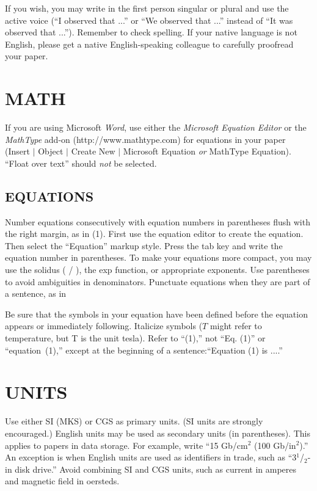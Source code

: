 \documentclass{IEEEojcsys}
\begin{document}
If you wish, you may write in the first person singular or plural and use the active voice (``I observed that ...'' or ``We observed that ...'' instead of ``It was observed that ...''). Remember to check spelling. If your native language is not English, please get a native English-speaking colleague to carefully proofread your paper.

\section{MATH}

If you are using Microsoft {\it Word}, use either the {\it Microsoft Equation Editor} or the {\it MathType} add-on (http://www.mathtype.com) for equations in your paper (Insert $|$ Object $|$ Create New $|$ Microsoft Equation {\it or} MathType Equation). ``Float over text'' should {\it not} be selected.

\subsection{EQUATIONS}

Number equations consecutively with equation numbers in parentheses flush with the right margin, as in (1). First use the equation editor to create the equation. Then select the ``Equation'' markup style. Press the tab key and write the equation number in parentheses. To make your equations more compact, you may use the solidus ( / ), the exp function, or appropriate exponents. Use parentheses to avoid ambiguities in denominators. Punctuate equations when they are part of a sentence, as in
\begin{equation}
\!
\end{equation}

Be sure that the symbols in your equation have been defined before the equation appears or immediately following. Italicize symbols ($T$ might refer to temperature, but T is the unit tesla). Refer to ``(1),'' not ``Eq. (1)'' or ``equation~(1),'' except at the beginning of a sentence:\break ``Equation (1) is ....''


\section{UNITS}

Use either SI (MKS) or CGS as primary units. (SI units are strongly encouraged.) English units may be used as secondary units (in parentheses). This applies to papers in data storage. For example, write ``15 Gb/cm$^2$ (100 Gb/in$^2$).'' An exception is when English units are used as identifiers in trade, such as ``3$^1${/}$_2$-in disk drive.'' Avoid combining SI and CGS units, such as current in amperes and magnetic field in oersteds. %
\end{document}
